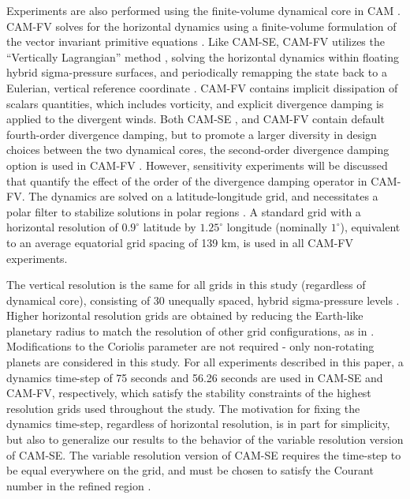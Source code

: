 Experiments are also performed using the finite-volume dynamical core in CAM \citep[CAM-FV;][]{L2004MWR,CAM5}. CAM-FV solves for the horizontal dynamics using a finite-volume formulation of the vector invariant primitive equations \citep{LR1997QJR}. Like CAM-SE, CAM-FV utilizes the “Vertically Lagrangian” method \citep{L2004MWR}, solving the horizontal dynamics within floating hybrid sigma-pressure surfaces, and periodically remapping the state back to a Eulerian, vertical reference coordinate \citep{CAM5}. CAM-FV contains implicit dissipation of scalars quantities, which includes vorticity, and explicit divergence damping is applied to the divergent winds. Both CAM-SE \citep{DetAl2012IJHPCA}, and CAM-FV \citep{L2011IJHPC,WJRL2010MWR} contain default fourth-order divergence damping, but to promote a larger diversity in design choices between the two dynamical cores, the second-order divergence damping option is used in CAM-FV \citep{CAM3}. However, sensitivity experiments will be discussed that quantify the effect of the order of the divergence damping operator in CAM-FV. The dynamics are solved on a latitude-longitude grid, and necessitates a polar filter to stabilize solutions in polar regions \citep{CAM5}. A standard grid with a horizontal resolution of $0.9^{\circ}$ latitude by $1.25^{\circ}$ longitude (nominally $1^{\circ}$), equivalent to an average equatorial grid spacing of 139 km, is used in all CAM-FV experiments.

The vertical resolution is the same for all grids in this study (regardless of dynamical core), consisting of 30 unequally spaced, hybrid sigma-pressure levels \citep{CAM5}. Higher horizontal resolution grids are obtained by reducing the Earth-like planetary radius to match the resolution of other grid configurations, as in \cite{RM2016GRL}. Modifications to the Coriolis parameter are not required - only non-rotating planets are considered in this study. For all experiments described in this paper, a dynamics time-step of 75 seconds and 56.26 seconds are used in CAM-SE and CAM-FV, respectively, which satisfy the stability constraints of the highest resolution grids used throughout the study. The motivation for fixing the dynamics time-step, regardless of horizontal resolution, is in part for simplicity, but also to generalize our results to the behavior of the variable resolution version of CAM-SE. The variable resolution version of CAM-SE requires the time-step to be equal everywhere on the grid, and must be chosen to satisfy the Courant number in the refined region \citep{ZetAl2014JC}.

